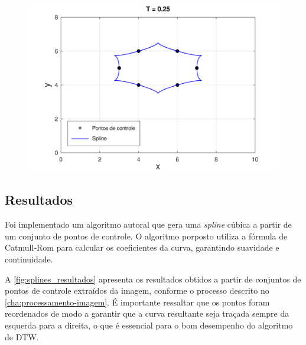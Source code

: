 \begin{figure}[h!]
    \begin{minipage}[b]{0.45\textwidth}
        \centering
        \includegraphics[width=1\linewidth]{fig/cat_rom_t025.png}
        \label{fig:tensao025}
    \end{minipage}
    \label{fig:tensao}
\end{figure}

\subsection{Resultados}

Foi implementado um algoritmo autoral que gera uma \textit{spline} cúbica a partir de um conjunto de pontos de controle. O algoritmo porposto utiliza a fórmula de Catmull-Rom para calcular os coeficientes da curva, garantindo suavidade e continuidade. 

A \autoref{fig:splines_resultados} apresenta os resultados obtidos a partir de conjuntos de pontos de controle extraídos da imagem, conforme o processo descrito no \autoref{cha:processamento-imagem}. É importante ressaltar que os pontos foram reordenados de modo a garantir que a curva resultante seja traçada sempre da esquerda para a direita, o que é essencial para o bom desempenho do algoritmo de DTW.


